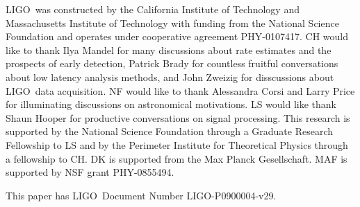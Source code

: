 \documentclass[preprint2]{aastex}
\newcommand{\LIGO}{LIGO}%
\begin{document}
\acknowledgements

\LIGO\ was constructed by the California Institute of Technology and
Massachusetts Institute of Technology with funding from the National Science
Foundation and operates under cooperative agreement PHY-0107417.  CH would like
to thank Ilya Mandel for many discussions about rate estimates and the prospects
of early detection, Patrick Brady for countless fruitful conversations about low
latency analysis methods, and John Zweizig for disscussions about \LIGO\ data
acquisition.  NF would like to thank Alessandra Corsi and Larry Price for
illuminating discussions on astronomical motivations.  LS would like thank Shaun
Hooper for productive conversations on signal processing.  This research is
supported by the National Science Foundation through a Graduate Research
Fellowship to LS and by the Perimeter Institute for Theoretical Physics through
a fellowship to CH. DK is supported from the Max Planck Gesellschaft.
MAF is supported by NSF grant PHY-0855494.

This paper has \LIGO\ Document Number {LIGO-P0900004-v29}.



\end{document}
